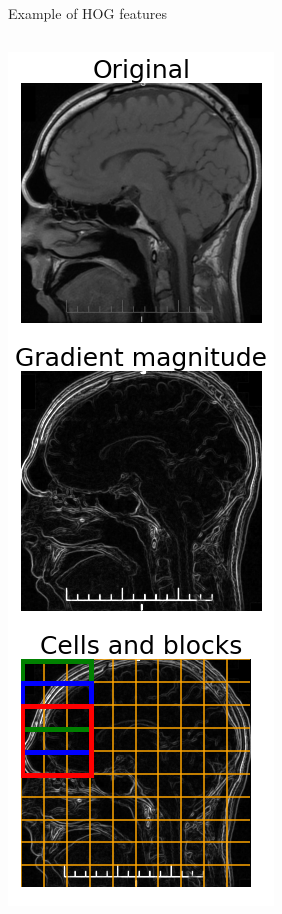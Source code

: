 \documentclass[9pt, aspectratio=169]{beamer}
\begin{document}
\begin{frame}
    {Example of HOG features}
    \begin{columns}
        \begin{column}{.2\textwidth}
            \includegraphics[width=.85\textwidth]{HOG_pt1.png}

\end{column}
\end{columns}
\end{frame}
\end{document}

